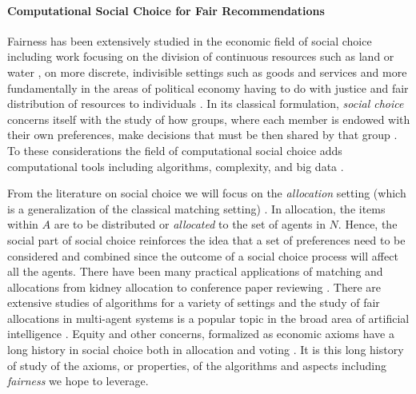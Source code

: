\noindent \paragraph{Computational Social Choice for Fair Recommendations} \newline
\indent Fairness has been extensively studied in the economic field of social choice including work focusing on the division of continuous resources such as land or water \cite{Moulin:FairDivision}, on more discrete, indivisible settings such as goods and services \cite{Thomson:FairRules,Thomson:IntroFairAllocation} and more fundamentally in the areas of political economy having to do with justice and fair distribution of resources to individuals \cite{Young:Equity,Rawls:Justice,Rescher:Justice}. In its classical formulation, \emph{social choice} concerns itself with the study of how groups, where each member is endowed with their own preferences, make decisions that must be then shared by that group \cite{Sen:CollectiveChoice}. To these considerations the field of computational social choice adds computational tools including algorithms, complexity, and big data \cite{BCELP16a,DBLP:conf/ijcai/Mattei20}.


From the literature on social choice we will focus on the \emph{allocation} setting (which is a generalization of the classical matching setting) \cite{BCELP16a}. In allocation, the items within $A$ are to be distributed or \emph{allocated} to the set of agents in $N$.  Hence, the social part of social choice reinforces the idea that a set of preferences need to be considered and combined since the outcome of a social choice process will affect all the agents.  There have been many practical applications of matching and allocations from kidney allocation \cite{Roth:Kidney} to conference paper reviewing \cite{LiMaNoWa18}.  There are extensive studies of algorithms for a variety of settings \cite{Manlove:MatchingPrefs} and the study of fair allocations in multi-agent systems is a popular topic in the broad area of artificial intelligence \cite{Aziz:FairAllocation}. Equity and other concerns, formalized as economic axioms have a long history in social choice both in allocation \cite{Young:Equity} and voting \cite{Zwicker:Voting}. It is this long history of study of the axioms, or properties, of the algorithms and aspects including \emph{fairness} we hope to leverage.


